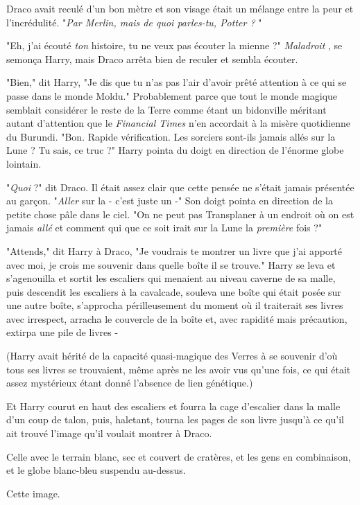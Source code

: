 Draco avait reculé d'un bon mètre et son visage était un mélange entre la peur et l'incrédulité. "\emph{Par Merlin, mais de quoi parles-tu, Potter ?} "

"Eh, j'ai écouté \emph{ton}  histoire, tu ne veux pas écouter la mienne ?" \emph{Maladroit} , se semonça Harry, mais Draco arrêta bien de reculer et sembla écouter.

"Bien," dit Harry, "Je dis que tu n'as pas l'air d'avoir prêté attention à ce qui se passe dans le monde Moldu." Probablement parce que tout le monde magique semblait considérer le reste de la Terre comme étant un bidonville méritant autant d'attention que le \emph{Financial Times}  n'en accordait à la misère quotidienne du Burundi. "Bon. Rapide vérification. Les sorciers sont-ils jamais allés sur la Lune ? Tu sais, ce truc ?" Harry pointa du doigt en direction de l'énorme globe lointain.

"\emph{Quoi}  ?" dit Draco. Il était assez clair que cette pensée ne s'était jamais présentée au garçon. "\emph{Aller}  sur la - c'est juste un -" Son doigt pointa en direction de la petite chose pâle dans le ciel. "On ne peut pas Transplaner à un endroit où on est jamais \emph{allé}  et comment qui que ce soit irait sur la Lune la \emph{première}  fois ?"

"Attends," dit Harry à Draco, "Je voudrais te montrer un livre que j'ai apporté avec moi, je crois me souvenir dans quelle boîte il se trouve." Harry se leva et s'agenouilla et sortit les escaliers qui menaient au niveau caverne de sa malle, puis descendit les escaliers à la cavalcade, souleva une boîte qui était posée sur une autre boîte, s'approcha périlleusement du moment où il traiterait ses livres avec irrespect, arracha le couvercle de la boîte et, avec rapidité mais précaution, extirpa une pile de livres -

(Harry avait hérité de la capacité quasi-magique des Verres à se souvenir d'où tous ses livres se trouvaient, même après ne les avoir vus qu'une fois, ce qui était assez mystérieux étant donné l'absence de lien génétique.)

Et Harry courut en haut des escaliers et fourra la cage d'escalier dans la malle d'un coup de talon, puis, haletant, tourna les pages de son livre jusqu'à ce qu'il ait trouvé l'image qu'il voulait montrer à Draco.

Celle avec le terrain blanc, sec et couvert de cratères, et les gens en combinaison, et le globe blanc-bleu suspendu au-dessus.

Cette image.

